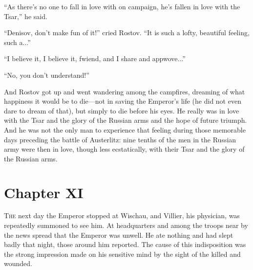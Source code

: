 ``As there's no one to fall in love with on campaign, he's fallen
in love with the Tsar,'' he said.

``Denisov, don't make fun of it!'' cried Rostov. ``It is such a
lofty, beautiful feeling, such a...''

``I believe it, I believe it, fwiend, and I share and
appwove...''

``No, you don't understand!''

And Rostov got up and went wandering among the campfires,
dreaming of what happiness it would be to die---not in saving the
Emperor's life (he did not even dare to dream of that), but
simply to die before his eyes.  He really was in love with the
Tsar and the glory of the Russian arms and the hope of future
triumph. And he was not the only man to experience that feeling
during those memorable days preceding the battle of Austerlitz:
nine tenths of the men in the Russian army were then in love,
though less ecstatically, with their Tsar and the glory of the
Russian arms.


\chapter*{Chapter XI}
\ifaudio     
{} 
\fi

\lettrine[lines=2, loversize=0.3, lraise=0]{\initfamily T}{he}
next day the Emperor stopped at Wischau, and Villier, his
physician, was repeatedly summoned to see him. At headquarters
and among the troops near by the news spread that the Emperor was
unwell. He ate nothing and had slept badly that night, those
around him reported. The cause of this indisposition was the
strong impression made on his sensitive mind by the sight of the
killed and wounded.

